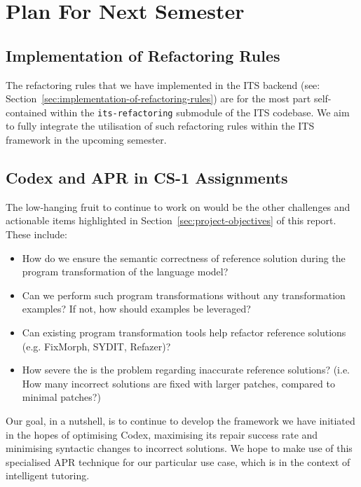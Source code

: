 \chapter{Plan For Next Semester}

\section{Implementation of Refactoring Rules}

The refactoring rules that we have implemented in the ITS backend
(see: Section~\ref{sec:implementation-of-refactoring-rules})
are for the most part self-contained within the \texttt{its-refactoring} submodule of
the ITS codebase.
We aim to fully integrate the utilisation of such refactoring rules within the ITS
framework in the upcoming semester.

\section{Codex and APR in CS-1 Assignments}

The low-hanging fruit to continue to work on would be the other challenges and
actionable items highlighted in Section~\ref{sec:project-objectives} of this report.
These include:
\begin{itemize}
    \item How do we ensure the semantic correctness of reference solution during the program
          transformation of the language model?
    \item Can we perform such program transformations without any transformation examples?
          If not, how should examples be leveraged?
    \item Can existing program transformation tools help refactor reference solutions
          (e.g. FixMorph, SYDIT, Refazer)?
    \item How severe the is the problem regarding inaccurate reference solutions?
          (i.e. How many incorrect solutions are fixed with larger patches, compared
           to minimal patches?)
\end{itemize}

Our goal, in a nutshell, is to continue to develop the framework we have initiated
in the hopes of optimising Codex, maximising its repair success rate and minimising
syntactic changes to incorrect solutions.
We hope to make use of this specialised APR technique for our particular use case,
which is in the context of intelligent tutoring.


